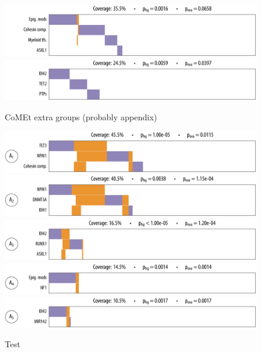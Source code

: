 \begin{figure}[htb]
\centering
\includegraphics[width=\textwidth]{figures/genes/aml_comet1.pdf}\\[2em]
\includegraphics[width=\textwidth]{figures/genes/aml_comet2.pdf}\\[2em]
\caption{CoMEt extra groups (probably appendix)}
\end{figure}

\begin{figure}[htb]
\centering
\includegraphics[width=\textwidth]{figures/genes/aml_2_a.pdf}\\[2em]
\includegraphics[width=\textwidth]{figures/genes/aml_1_a.pdf}\\[2em]
\includegraphics[width=\textwidth]{figures/genes/aml_3_a.pdf}\\[2em]
\includegraphics[width=\textwidth]{figures/genes/aml_5_a.pdf}\\[2em]
\includegraphics[width=\textwidth]{figures/genes/aml_4_a.pdf}\\[2em]
\caption{Test}
\end{figure}

